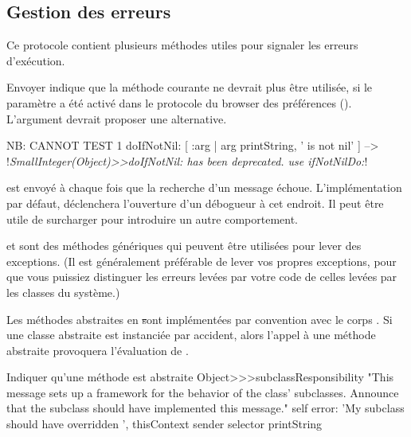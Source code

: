 \documentclass[a4paper,10pt,twoside]{book}
\begin{document}
\subsection{Gestion des erreurs}

Ce protocole contient plusieurs m\'ethodes utiles pour signaler les erreurs d'ex\'ecution.

Envoyer  indique que la m\'ethode courante ne devrait plus \^etre utilis\'ee, si le param\`etre  a \'et\'e activ\'e dans le protocole  du browser des pr\'ef\'erences ().
L'argument  devrait proposer une alternative.

\begin{code}{NB: CANNOT TEST}
1 doIfNotNil: [ :arg | arg printString, ' is not nil' ]
	--> !\emph{SmallInteger(Object)>>doIfNotNil: has been deprecated. use ifNotNilDo:}!
\end{code}

 est envoy\'e \`a chaque fois que la recherche d'un message \'echoue. L'impl\'ementation par d\'efaut, \ie {} d\'eclenchera l'ouverture d'un d\'ebogueur \`a cet endroit. Il peut \^etre utile de surcharger  pour introduire un autre comportement.


 et  sont des m\'ethodes g\'en\'eriques qui peuvent \^etre utilis\'ees pour lever des exceptions.
(Il est g\'en\'eralement pr\'ef\'erable de lever vos propres exceptions, pour que vous puissiez distinguer les erreurs lev\'ees par votre code de celles lev\'ees par les classes du syst\`eme.)

Les m\'ethodes abstraites en \st sont impl\'ement\'ees par convention avec le corps . Si une classe abstraite est instanci\'ee par accident, alors l'appel \`a une m\'ethode abstraite provoquera l'\'evaluation de .

\begin{method}{Indiquer qu'une m\'ethode est abstraite}
Object>>>subclassResponsibility
    "This message sets up a framework for the behavior of the class' subclasses.
    Announce that the subclass should have implemented this message."
    self error: 'My subclass should have overridden ', thisContext sender selector printString
\end{method}
\end{document}
